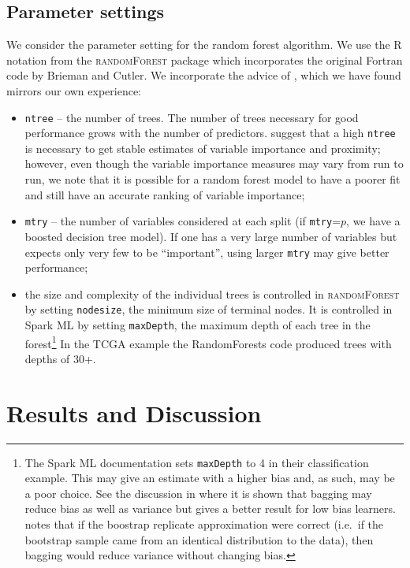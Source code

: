 \documentclass[10pt,letterpaper]{article}
\newcommand{\randomforest}{\textsc{randomForest}\xspace}
\newcommand{\mtry}{\texttt{mtry}\xspace}
\newcommand{\ntree}{\texttt{ntree}\xspace}
\begin{document}
\subsection{Parameter settings}
We consider the parameter setting for the random forest algorithm. We use the R notation from the \randomforest
package \cite{Liaw.and.Weiner.2002} which incorporates the original Fortran code by Brieman and Cutler.  We incorporate
the advice of \cite{Liaw.and.Weiner.2002}, which we have found mirrors our own experience:
\begin{itemize}
\item \ntree{}  -- the number of trees.  The number of trees necessary for good performance grows with the number of
  predictors.  \cite{Liaw.and.Weiner.2002} suggest that a high \ntree is necessary to get stable estimates of variable
  importance and proximity; however, even though the variable importance measures may vary from run to run, we note that
  it is possible for a random forest model to have a poorer fit and still have an accurate ranking of variable
  importance;
\item \mtry{}  -- the number of variables considered at each split (if \mtry=$p$, we have a boosted decision
  tree model).  If one has a very large number of variables but expects only very few to be ``important'', using larger \mtry may give
  better performance;
\item the size and complexity of the individual trees is controlled in \randomforest by setting \texttt{nodesize}, the
  minimum size of terminal nodes. It is controlled in Spark ML by setting \texttt{maxDepth}, the maximum depth of each
  tree in the forest\footnote{The Spark ML documentation \cite[]{Spark.2016} sets \texttt{maxDepth} to 4 in their
    classification example. This may give an estimate with a higher bias and, as such, may be a poor choice. See the
    discussion in \cite{Dietterich.2002} where it is shown that bagging may reduce bias as well as variance but gives a
    better result for low bias learners. \cite{Dietterich.2002} notes that if the boostrap replicate approximation were
    correct (i.e.~if the bootstrap sample came from an identical distribution to the data), then bagging would reduce
    variance without changing bias.} In the TCGA example the RandomForests code produced trees with depths of 30+.
\end{itemize}



%
%
\section{Results and Discussion}
\end{document}
